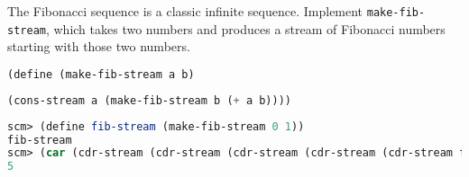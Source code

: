 \question The Fibonacci sequence is a classic infinite sequence. Implement
\texttt{make-fib-stream}, which takes two numbers and produces a stream of
Fibonacci numbers starting with those two numbers.
\newline
\begin{lstlisting}[language=Scheme]
(define (make-fib-stream a b)
\end{lstlisting}
\begin{solution}[2cm]
\begin{lstlisting}[language=Scheme]
  (cons-stream a (make-fib-stream b (+ a b))))
\end{lstlisting}
\end{solution}
\begin{lstlisting}[language=Scheme]
scm> (define fib-stream (make-fib-stream 0 1))
fib-stream
scm> (car (cdr-stream (cdr-stream (cdr-stream (cdr-stream (cdr-stream fib-stream))))))
5
\end{lstlisting}
